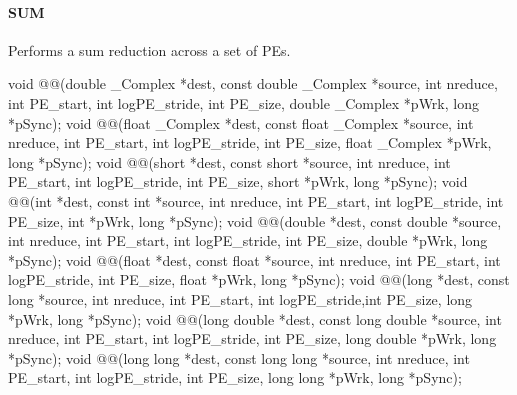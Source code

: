 \begin{apidefinition}
\paragraph{SUM}
Performs a sum reduction across a set of \acp{PE}.\newline
\begin{Csynopsis}
void @@(double _Complex *dest, const double _Complex *source, int nreduce, int PE_start, int logPE_stride, int PE_size, double _Complex *pWrk, long *pSync);
void @@(float _Complex *dest, const float _Complex *source, int nreduce, int PE_start, int logPE_stride, int PE_size, float _Complex *pWrk, long *pSync);
void @@(short *dest, const short *source, int nreduce, int PE_start, int logPE_stride, int PE_size, short *pWrk, long *pSync);
void @@(int *dest, const int *source, int nreduce, int PE_start, int logPE_stride, int PE_size, int *pWrk, long *pSync);
void @@(double *dest, const double *source, int nreduce, int PE_start, int logPE_stride, int PE_size, double *pWrk, long *pSync);
void @@(float *dest, const float *source, int nreduce, int PE_start, int logPE_stride, int PE_size, float *pWrk, long *pSync);
void @@(long *dest, const long *source, int nreduce, int PE_start, int logPE_stride,int PE_size, long *pWrk, long *pSync);
void @@(long double *dest, const long double *source, int nreduce, int PE_start, int logPE_stride, int PE_size, long double *pWrk, long *pSync);
void @@(long long *dest, const long long *source, int nreduce, int PE_start, int logPE_stride, int PE_size, long long *pWrk, long *pSync);
\end{Csynopsis}


\end{apidefinition}
